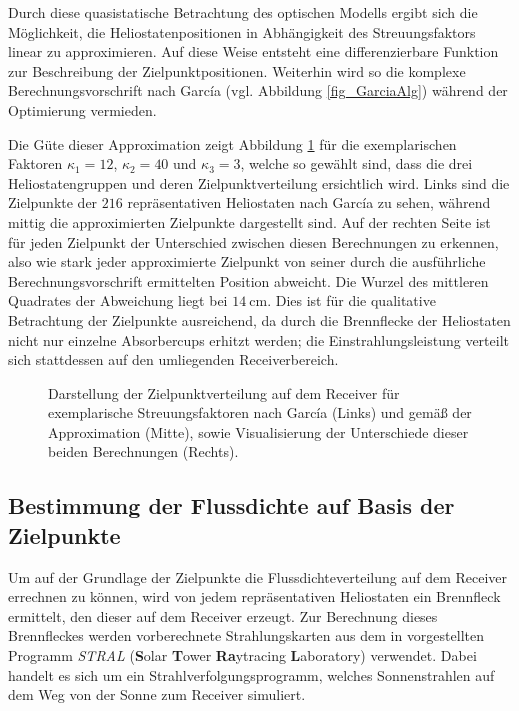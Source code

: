 Durch diese quasistatische Betrachtung des optischen Modells ergibt sich die Möglichkeit, die Heliostatenpositionen in Abhängigkeit des Streuungsfaktors linear zu approximieren.
Auf diese Weise entsteht eine differenzierbare Funktion zur Beschreibung der Zielpunktpositionen.
Weiterhin wird so die komplexe Berechnungsvorschrift nach García (vgl. Abbildung \ref{fig_GarciaAlg}) während der Optimierung vermieden.

Die Güte dieser Approximation zeigt Abbildung \ref{fig_GüteApprox} für die exemplarischen Faktoren $\kappa_1 = 12$, $\kappa_2 = 40$ und $\kappa_3 = 3$, welche so gewählt sind, dass die drei Heliostatengruppen und deren Zielpunktverteilung ersichtlich wird.
Links sind die Zielpunkte der $216$ repräsentativen Heliostaten nach García zu sehen, während mittig die approximierten Zielpunkte dargestellt sind.
Auf der rechten Seite ist für jeden Zielpunkt der Unterschied zwischen diesen Berechnungen zu erkennen, also wie stark jeder approximierte Zielpunkt von seiner durch die ausführliche Berechnungsvorschrift ermittelten Position abweicht.
Die Wurzel des mittleren Quadrates der Abweichung liegt bei $\SI{14}{\centi\metre}$.
Dies ist für die qualitative Betrachtung der Zielpunkte ausreichend, da durch die Brennflecke der Heliostaten nicht nur einzelne Absorbercups erhitzt werden; die Einstrahlungsleistung verteilt sich stattdessen auf den umliegenden Receiverbereich.

\begin{figure}[h!]
    \centering
    \setlength{\fboxsep}{1pt}
    \setlength{\fboxrule}{1pt}
    \caption[Darstellung der Zielpunktverteilung auf dem Receiver für exemplarische Streuungsfaktoren nach García und gemäß der Approximation, sowie Visualisierung der Unterschiede dieser beiden Berechnungen.]{Darstellung der Zielpunktverteilung auf dem Receiver für exemplarische Streuungsfaktoren nach García (Links) und gemäß der Approximation (Mitte), sowie Visualisierung der Unterschiede dieser beiden Berechnungen (Rechts).}
    \label{fig_GüteApprox}
\end{figure}

\subsection{Bestimmung der Flussdichte auf Basis der Zielpunkte} \label{subsec_VerknüfungZielpunkteEinstrahlung}
Um auf der Grundlage der Zielpunkte die Flussdichteverteilung auf dem Receiver errechnen zu können, wird von jedem repräsentativen Heliostaten ein Brennfleck ermittelt, den dieser auf dem Receiver erzeugt.
Zur Berechnung dieses Brennfleckes werden vorberechnete Strahlungskarten aus dem in \cite[S.53ff]{DissBelhomme} vorgestellten Programm \textit{STRAL} (\textbf{S}olar \textbf{T}ower \textbf{Ra}ytracing \textbf{L}aboratory) verwendet.
Dabei handelt es sich um ein Strahlverfolgungsprogramm, welches Sonnenstrahlen auf dem Weg von der Sonne zum Receiver simuliert.

